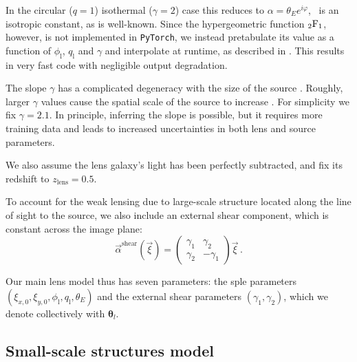 In the circular ($q=1$) isothermal ($\gamma=2$) case this reduces to $\alpha=\theta_E e^{i\varphi}$, \ie~is an isotropic constant, as is well-known. Since the hypergeometric function ${}_2\mathrm{F}_1$, however, is not implemented in \texttt{PyTorch}, we instead pretabulate its value as a function of $\phi_\mathrm{l}$, $q_\mathrm{l}$ and $\gamma$ and interpolate at runtime, as described in \cite{Chianese:2019ifk}. This results in very fast code with negligible output degradation.

The slope $\gamma$ has a complicated degeneracy with the size of the source \citep{Schneider:2013sxa,Schneider:2013wga}. Roughly, larger $\gamma$ values cause the spatial scale of the source to increase \citep[sec. 3.3]{Nightingale:2014aa}. For simplicity we fix $\gamma = 2.1$. In principle, inferring the slope is possible, but it requires more training data and leads to increased uncertainties in both lens and source parameters.

We also assume the lens galaxy's light has been perfectly subtracted, and fix its redshift to $z_\mathrm{lens} = 0.5$.

To account for the weak lensing due to large-scale structure located along the line of sight to the source, we also include an external shear component, which is constant across the image plane:
\begin{equation}
    \vec{\alpha}^\mathrm{shear}(\vec{\xi}) = \begin{pmatrix} \gamma_1 & \gamma_2 \\ \gamma_2 & -\gamma_1 \end{pmatrix} \vec{\xi} \, .
\end{equation}

Our main lens model thus has seven parameters: the \gls*{sple} parameters $(\xi_{x, 0}, \xi_{y, 0}, \phi_\mathrm{l}, q_\mathrm{l}, \theta_E)$ and the external shear parameters $(\gamma_1, \gamma_2)$, which we denote collectively with $\bm \theta_l$.

\subsection{Small-scale structures model} \label{subsec:substructure}

